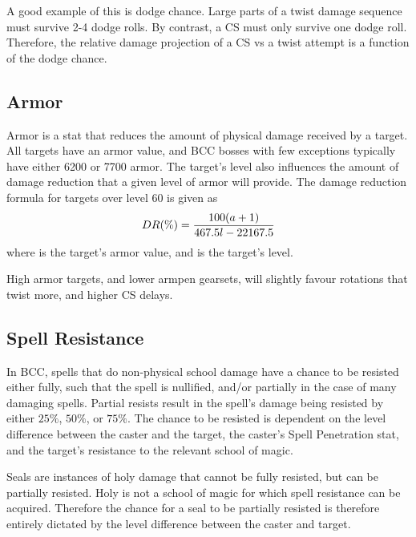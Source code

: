 \documentclass[letterpaper,11pt]{article}
\begin{document}
	A good example of this is dodge chance.
	Large parts of a twist damage sequence must survive 2-4 dodge rolls.
	By contrast, a CS must only survive one dodge roll.
	Therefore, the relative damage projection of a CS vs a twist attempt is a function of the dodge chance.
	
	\subsection{Armor}
	Armor is a stat that reduces the amount of physical damage received by a target.
	All targets have an armor value, and BCC bosses with few exceptions typically have either 6200 or 7700 armor.
	The target's level also influences the amount of damage reduction that a given level of armor will provide.
	The damage reduction formula for targets over level 60 is given as
	\begin{equation}
		DR(\%)  = \frac{100(a + 1)}{467.5 l -22167.5}
	\end{equation}
	where \armor is the target's armor value, and \lvl is the target's level.

	High armor targets, and lower armpen gearsets, will slightly favour rotations that twist more, and higher CS delays.	
	
	
	\subsection{Spell Resistance}
	In BCC, spells that do non-physical school damage have a chance to be resisted either fully, such that the spell is nullified, and/or partially in the case of many damaging spells.
	Partial resists result in the spell's damage being resisted by either $25\%$, $50\%$, or $75\%$.
	The chance to be resisted is dependent on the level difference between the caster and the target, the caster's Spell Penetration stat, and the target's resistance to the relevant school of magic.
	
	Seals are instances of holy damage that cannot be fully resisted, but can be partially resisted.
	Holy is not a school of magic for which spell resistance can be acquired.
	Therefore the chance for a seal to be partially resisted is therefore entirely dictated by the level difference between the caster and target.
	
\end{document}
